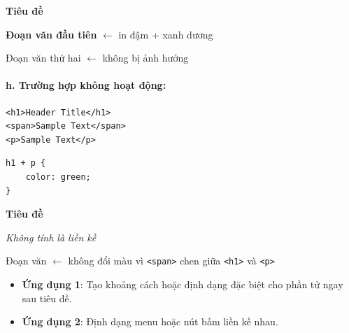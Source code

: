 \documentclass[11pt,oneside]{book}
\newcommand{\codeinline}[1]{\textcolor{accentOrange}{\texttt{#1}}}
\begin{document}
\begin{browserWindow}
\sffamily\small
{\bfseries\Large\textcolor{darkText}{Tiêu đề}} \par\vspace{4pt}
\textcolor{primaryBlue}{\textbf{Đoạn văn đầu tiên}} {\small\textcolor{gray!60}{$\leftarrow$ in đậm + xanh dương}} \par\vspace{2pt}
\textcolor{darkText}{Đoạn văn thứ hai} {\small\textcolor{gray!60}{$\leftarrow$ không bị ảnh hưởng}}
\end{browserWindow}

\paragraph{h. Trường hợp không hoạt động:}
\begin{codeWindow}
\begin{lstlisting}[language=HTML5]
<h1>Header Title</h1>
<span>Sample Text</span>
<p>Sample Text</p>
\end{lstlisting}

\begin{lstlisting}[language=CSS3]
h1 + p {
    color: green;
}
\end{lstlisting}
\end{codeWindow}

\begin{browserWindow}
\sffamily\small
{\bfseries\Large\textcolor{darkText}{Tiêu đề}} \par\vspace{4pt}
\textcolor{darkText}{\textit{Không tính là liền kề}} \par\vspace{2pt}
\textcolor{darkText}{Đoạn văn} {\small\textcolor{gray!60}{$\leftarrow$ không đổi màu vì \codeinline{<span>} chen giữa \codeinline{<h1>} và \codeinline{<p>}}}
\end{browserWindow}

\begin{tipBox}
\begin{itemize}[leftmargin=1.5em, itemsep=3pt, parsep=0pt]
    \item \textbf{Ứng dụng 1}: Tạo khoảng cách hoặc định dạng đặc biệt cho phần tử ngay sau tiêu đề.
    \item \textbf{Ứng dụng 2}: Định dạng menu hoặc nút bấm liền kề nhau.
\end{itemize}
\end{tipBox}
\end{document}
